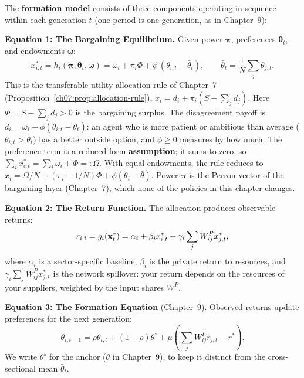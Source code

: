 \documentclass[../structural_economics_book.tex]{subfiles}
\begin{document}
\begin{definition}\label{ch10:def:model}
The \textbf{formation model} consists of three components operating in sequence within each generation $t$ (one period is one generation, as in Chapter~9):

\textbf{Equation 1: The Bargaining Equilibrium.} Given power $\boldsymbol{\pi}$, preferences $\boldsymbol{\theta}_t$, and endowments $\boldsymbol{\omega}$:
\begin{equation}\label{ch10:eq:bargaining}
x_{i,t}^* = h_i(\boldsymbol{\pi}, \boldsymbol{\theta}_t, \boldsymbol{\omega}) = \omega_i + \pi_i\Phi + \phi\,(\theta_{i,t} - \bar{\theta}_t),
\qquad \bar{\theta}_t = \frac{1}{N}\sum_j \theta_{j,t}.
\end{equation}
This is the transferable-utility allocation rule of Chapter~7 (Proposition~\ref{ch07:prop:allocation-rule}), $x_i = d_i + \pi_i(S - \sum_j d_j)$. Here $\Phi = S - \sum_j d_j > 0$ is the bargaining surplus. The disagreement payoff is $d_i = \omega_i + \phi(\theta_{i,t} - \bar{\theta}_t)$: an agent who is more patient or ambitious than average ($\theta_{i,t} > \bar{\theta}_t$) has a better outside option, and $\phi \geq 0$ measures by how much. The preference term is a reduced-form \textbf{assumption}; it sums to zero, so $\sum_i x_{i,t}^* = \sum_i\omega_i + \Phi =: \Omega$. With equal endowments, the rule reduces to $x_i = \Omega/N + (\pi_i - 1/N)\Phi + \phi(\theta_i - \bar{\theta})$. Power $\boldsymbol{\pi}$ is the Perron vector of the bargaining layer (Chapter~7), which none of the policies in this chapter changes.

\textbf{Equation 2: The Return Function.} The allocation produces observable returns:
\begin{equation}\label{ch10:eq:returns}
r_{i,t} = g_i(\mathbf{x}_t^*) = \alpha_i + \beta_i x_{i,t}^* + \gamma_i \sum_j W^P_{ij} x_{j,t}^*,
\end{equation}
where $\alpha_i$ is a sector-specific baseline, $\beta_i$ is the private return to resources, and $\gamma_i \sum_j W^P_{ij} x_{j,t}^*$ is the network spillover: your return depends on the resources of your suppliers, weighted by the input shares $W^P$.

\textbf{Equation 3: The Formation Equation} (Chapter~9). Observed returns update preferences for the next generation:
\begin{equation}\label{ch10:eq:formation}
\theta_{i,t+1} = \rho\theta_{i,t} + (1-\rho)\theta^{\circ} + \mu\left(\sum_j W^I_{ij} r_{j,t} - r^*\right).
\end{equation}
We write $\theta^{\circ}$ for the anchor ($\bar{\theta}$ in Chapter~9), to keep it distinct from the cross-sectional mean $\bar{\theta}_t$.
\end{definition}
\end{document}
